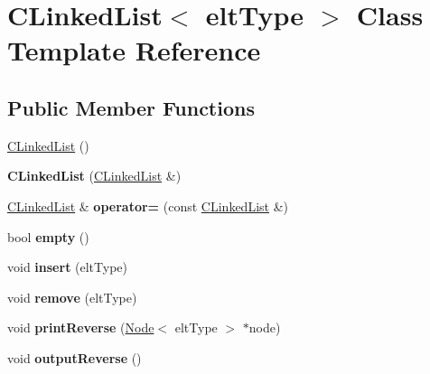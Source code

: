 \hypertarget{classCLinkedList}{\section{C\-Linked\-List$<$ elt\-Type $>$ Class Template Reference}
\label{classCLinkedList}
}
\subsection*{Public Member Functions}
\begin{DoxyCompactItemize}
\item 
\hyperlink{classCLinkedList_ac2b1b70699e9ef70c991fad0a7244d09}{C\-Linked\-List} ()
\item 
\hypertarget{classCLinkedList_aa9d627407d1582b4527d0d70086da869}{{\bfseries C\-Linked\-List} (\hyperlink{classCLinkedList}{C\-Linked\-List} \&)}\label{classCLinkedList_aa9d627407d1582b4527d0d70086da869}

\item 
\hypertarget{classCLinkedList_a5cdb18b23bb633c8a153f0c9cddec32c}{\hyperlink{classCLinkedList}{C\-Linked\-List} \& {\bfseries operator=} (const \hyperlink{classCLinkedList}{C\-Linked\-List} \&)}\label{classCLinkedList_a5cdb18b23bb633c8a153f0c9cddec32c}

\item 
\hypertarget{classCLinkedList_a125bed89da1a699270a84a0e67e00c89}{bool {\bfseries empty} ()}\label{classCLinkedList_a125bed89da1a699270a84a0e67e00c89}

\item 
\hypertarget{classCLinkedList_add7b881c6fdeb3c4fef12cdbec777eee}{void {\bfseries insert} (elt\-Type)}\label{classCLinkedList_add7b881c6fdeb3c4fef12cdbec777eee}

\item 
\hypertarget{classCLinkedList_a350c6d42e73a61d235ffe4f841bc4a0b}{void {\bfseries remove} (elt\-Type)}\label{classCLinkedList_a350c6d42e73a61d235ffe4f841bc4a0b}

\item 
\hypertarget{classCLinkedList_a9f18dd826bf027d1b92f070b50a1a4a8}{void {\bfseries print\-Reverse} (\hyperlink{classNode}{Node}$<$ elt\-Type $>$ $\ast$node)}\label{classCLinkedList_a9f18dd826bf027d1b92f070b50a1a4a8}

\item 
\hypertarget{classCLinkedList_a15b000c66769ffd368394c77fd71262d}{void {\bfseries output\-Reverse} ()}\label{classCLinkedList_a15b000c66769ffd368394c77fd71262d}

\end{DoxyCompactItemize}
